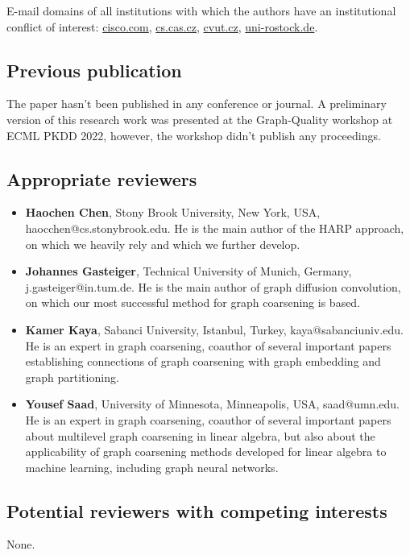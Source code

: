 \documentclass[sn-mathphys,pdflatex]{sn-jnl}%
\begin{document}
E-mail domains of all institutions with which the authors have an institutional conflict of interest: \href{cisco.com}{cisco.com}, \href{cs.cas.cz}{cs.cas.cz}, \href{cvut.cz}{cvut.cz}, \href{uni-rostock.de}{uni-rostock.de}.

\subsection*{Previous publication}

The paper hasn't been published in any conference or journal. A preliminary version of this research work was presented at the Graph-Quality workshop at ECML PKDD 2022, however, the workshop didn't publish any proceedings.

\subsection*{Appropriate reviewers}

\begin{itemize}
  \item \textbf{Haochen Chen}, Stony Brook University, New York, USA, haocchen@cs.stonybrook.edu. He is the main author of the HARP approach, on which we heavily rely and which we further develop.
  \item \textbf{Johannes Gasteiger}, Technical University of Munich, Germany, j.gasteiger@in.tum.de. He is the main author of graph diffusion convolution, on which our most successful method for graph coarsening is based.
  \item \textbf{Kamer Kaya}, Sabanci University, Istanbul, Turkey, kaya@sabanciuniv.edu. He is an expert in graph coarsening, coauthor of several important papers establishing connections of graph coarsening with graph embedding and graph partitioning.
  \item \textbf{Yousef Saad}, University of Minnesota, Minneapolis, USA, saad@umn.edu. He is an expert in graph coarsening, coauthor of several important papers about multilevel graph coarsening in linear algebra, but also about the applicability of graph coarsening methods developed for linear algebra to machine learning, including graph neural networks. 
\end{itemize}

\subsection*{Potential reviewers with competing interests}

None.


\end{document}
